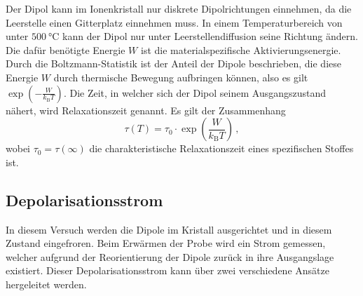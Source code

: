         \noindent Der Dipol kann im Ionenkristall nur diskrete Dipolrichtungen einnehmen, da die Leerstelle einen Gitterplatz einnehmen muss. In einem Temperaturbereich von unter 
        $\SI{500}{\celsius}$ kann der Dipol nur unter Leerstellendiffusion seine Richtung ändern. Die dafür benötigte Energie $W$ ist die materialspezifische Aktivierungsenergie.  
        Durch die Boltzmann-Statistik ist der Anteil der Dipole beschrieben, die diese Energie $W$ durch thermische Bewegung aufbringen können, also es gilt $\exp\left(- \frac{W}{k_\text{B}T}\right)$.
        Die Zeit, in welcher sich der Dipol seinem Ausgangszustand nähert, wird Relaxationszeit genannt. Es gilt der Zusammenhang
        \begin{equation*}
            \tau(T) = \tau_0 \cdot \exp \left(\frac{W}{k_\text{B}T}\right)\, ,
        \end{equation*}
        wobei $\tau_0 = \tau(\infty)$ die charakteristische Relaxationszeit eines spezifischen Stoffes ist. 


    \subsection{Depolarisationsstrom}

        \noindent In diesem Versuch werden die Dipole im Kristall ausgerichtet und in diesem Zustand eingefroren. Beim Erwärmen der Probe wird ein Strom gemessen, welcher aufgrund der 
        Reorientierung der Dipole zurück in ihre Ausgangslage existiert. Dieser Depolarisationsstrom kann über zwei verschiedene Ansätze hergeleitet werden. \\

